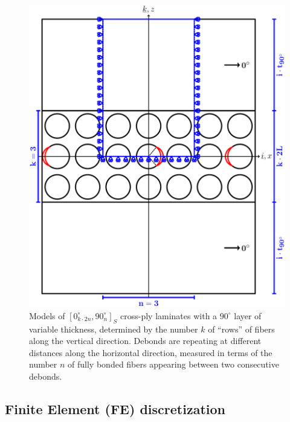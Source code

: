 \documentclass[review]{elsarticle}
\begin{document}
\begin{figure}[!h]
\centering
        \includegraphics[width=\textwidth]{ThickPly.pdf}
\caption{Models of $\left[0_{k\cdot2n}^{\circ},90_{n}^{\circ}\right]_{S}$ cross-ply laminates with a $90^{\circ}$ layer of variable thickness, determined by the number $k$ of ``rows'' of fibers along the vertical direction.  Debonds are repeating at different distances along the horizontal direction, measured in terms of the number $n$ of fully bonded fibers appearing between two consecutive debonds.}\label{fig:laminateModelsB}
\end{figure}


\subsection{Finite Element (FE) discretization}
\end{document}
